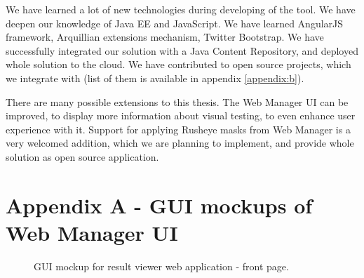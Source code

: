 \documentclass[11pt,oneside,final]{fithesis2}
\begin{document}
We have learned a lot of new technologies during developing of the tool. We have deepen our knowledge of Java EE and JavaScript. 
We have learned AngularJS framework, Arquillian extensions mechanism, Twitter Bootstrap. We have successfully integrated our solution with
a Java Content Repository, and deployed whole solution to the cloud. We have contributed to open source projects, which we integrate 
with (list of them is available in appendix \ref{appendix:b}).

There are many possible extensions to this thesis. The Web Manager UI can be improved, to display more information about visual testing,
to even enhance user experience with it. Support for applying Rusheye masks from Web Manager is a very welcomed addition, which we are planning
to implement, and provide whole solution as open source application.

\appendix
\chapter{Appendix A - GUI mockups of Web Manager UI}
\label{appendeix:a}

\begin{figure}[!htb]
    \begin{center}
    \leavevmode
    \centerline{}
    \end{center}
    \caption{GUI mockup for result viewer web application - front page.}
    \label{fig:frontPageMock}
\end{figure}
\end{document}
